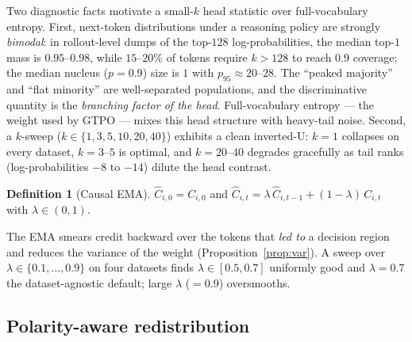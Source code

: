 \documentclass{article} %
\theoremstyle{plain}
\theoremstyle{definition}
\newtheorem{definition}[theorem]{Definition}
\theoremstyle{remark}
\begin{document}
Two diagnostic facts motivate a small-$k$ head statistic over full-vocabulary entropy. First, next-token distributions under a reasoning policy are strongly \emph{bimodal}: in rollout-level dumps of the top-$128$ log-probabilities, the median top-$1$ mass is $0.95$--$0.98$, while $15$--$20\%$ of tokens require $k>128$ to reach $0.9$ coverage; the median nucleus ($p{=}0.9$) size is $1$ with $p_{95}\approx 20$--$28$. The ``peaked majority'' and ``flat minority'' are well-separated populations, and the discriminative quantity is the \emph{branching factor of the head}. Full-vocabulary entropy --- the weight used by GTPO \citep{tan2025gtpo} --- mixes this head structure with heavy-tail noise. Second, a $k$-sweep ($k\in\{1,3,5,10,20,40\}$) exhibits a clean inverted-U: $k{=}1$ collapses on every dataset, $k{=}3$--$5$ is optimal, and $k{=}20$--$40$ degrades gracefully as tail ranks (log-probabilities $-8$ to $-14$) dilute the head contrast.

\begin{definition}[Causal EMA]
\label{def:ema}
$\hat C_{i,0}=C_{i,0}$ and $\hat C_{i,t} = \lambda\,\hat C_{i,t-1} + (1-\lambda)\,C_{i,t}$ with $\lambda\in(0,1)$.
\end{definition}

The EMA smears credit backward over the tokens that \emph{led to} a decision region and reduces the variance of the weight (Proposition~\ref{prop:var}). A sweep over $\lambda\in\{0.1,\dots,0.9\}$ on four datasets finds $\lambda\in[0.5,0.7]$ uniformly good and $\lambda=0.7$ the dataset-agnostic default; large $\lambda$ (${=}0.9$) oversmooths.

\subsection{Polarity-aware redistribution}
\label{sec:polarity}
\end{document}
